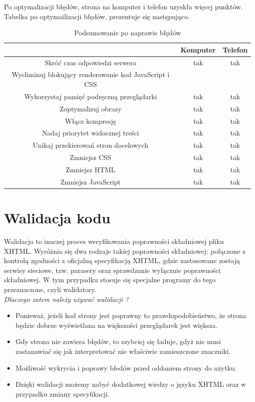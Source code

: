 \documentclass[openright]{xmgr}
\begin{document}
	Po optymalizacji błędów, strona na komputer i telefon uzyskła więcej punktów. Tabelka po optymailizacji błędów, prezentuje się następująco. 
	
	\begin{table} [!h]
		\centering
		\begin{footnotesize}
			\caption{Podsumowanie po naprawie błędów}
			\begin{tabular}{|c|c|c|}
				\hline  & Komputer  & Telefon \\ 
				\hline  Skróć czas odpowiedzi serwera & tak & tak \\ 
				\hline  Wyeliminuj blokujący renderowanie kod JavaScript i CSS &  &  \\ 
				\hline Wykorzystaj pamięć podręczną przeglądarki & tak & tak \\ 
				\hline Zoptymalizuj obrazy & tak & tak \\ 
				\hline Włącz kompresję & tak & tak \\ 
				\hline Nadaj priorytet widocznej treści & tak & tak \\ 
				\hline Unikaj przekierowań stron docelowych & tak & tak \\ 
				\hline Zmniejsz CSS & tak & tak \\ 
				\hline Zmniejsz HTML & tak & tak \\ 
				\hline Zmniejsz JavaScript & tak & tak \\ 
				\hline 
			\end{tabular} 
		\end{footnotesize}
	\end{table}
	
	
	\chapter{Walidacja kodu}
	
	Walidacja to inaczej proces weryfikowania poprawności składniowej pliku XHTML. Wyróżnia się dwa rodzaje takiej poprawności składniowej: połączone z kontrolą zgodności z oficjalną specyfikacją XHTML, gdzie zastosowane zostają serwisy sieciowe, tzw. parasery oraz sprawdzanie wyłącznie poprawności składniowej. W tym przypadku stosuje się specjalne programy do tego przeznaczone, czyli walidatory.\\
	
	\textit{Dlaczego zatem należy używać walidacji ?}
		\begin{itemize}
			\item Ponieważ, jeżeli kod strony jest poprawny to prawdopodobieństwo, że strona będzie dobrze wyświetlana na większości przeglądarek jest większa.
			\item Gdy strona nie zawiera błędów, to szybciej się ładuje, gdyż nie musi zastanawiać się jak interpretować nie właściwie zamieszczone znaczniki.
			\item Możliwość wykrycia i poprawy błedów przed oddaniem strony do użytku.
			\item Dzięki walidacji możemy nabyć dodatkowej wiedzy o języku XHTML oraz w przypadku zmiany specyfikacji.
		\end{itemize}
		
\end{document}
